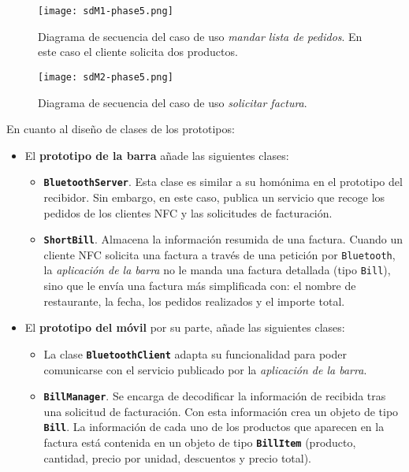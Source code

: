   \begin{sidewaysfigure}[hp]
    \begin{center}
      \texttt{[image: sdM1-phase5.png]}
      \caption{Diagrama de secuencia del caso de uso \emph{mandar lista
      de pedidos}. En este caso el cliente solicita dos productos.}
      \label{fig:sdM1-phase5}
    \end{center}
  \end{sidewaysfigure}

  \begin{sidewaysfigure}[hp]
    \begin{center}
      \texttt{[image: sdM2-phase5.png]}
      \caption{Diagrama de secuencia del caso de uso \emph{solicitar factura}.}
      \label{fig:sdM2-phase5}
    \end{center}
  \end{sidewaysfigure}
\newpage
En cuanto al diseño de clases de los prototipos:
\begin{itemize}
\item El \textbf{prototipo de la barra} añade las siguientes clases:
  \begin{itemize}
  \item \textbf{\texttt{BluetoothServer}}. Esta clase es similar a su homónima 
  en el prototipo del recibidor. Sin embargo, en este caso, publica un servicio 
  que recoge los pedidos de los clientes \acs{NFC} y las solicitudes de
  facturación.
  \item \textbf{\texttt{ShortBill}}. Almacena la información resumida de una 
  factura. Cuando un cliente \acs{NFC} solicita una factura a través de una 
  petición por \texttt{Bluetooth}, la \emph{aplicación de la barra} no le manda 
  una factura detallada (tipo \texttt{Bill}), sino que le envía una factura más
  simplificada con: el nombre de restaurante, la fecha, los pedidos realizados
  y el importe total.
  \end{itemize}
\item El \textbf{prototipo del móvil} por su parte, añade las siguientes
clases:
  \begin{itemize}
  \item La clase \textbf{\texttt{BluetoothClient}} adapta su funcionalidad para 
  poder comunicarse con el servicio publicado por la \emph{aplicación de la 
  barra}.
  \item \textbf{\texttt{BillManager}}. Se encarga de decodificar la información 
  de recibida tras una solicitud de facturación. Con esta información crea un
  objeto de tipo \textbf{\texttt{Bill}}. La información de cada uno de los
  productos que aparecen en la factura está contenida en un objeto de tipo
  \textbf{\texttt{BillItem}} (producto, cantidad, precio por unidad, descuentos
  y precio total).
  \end{itemize}
\end{itemize}
\newpage
